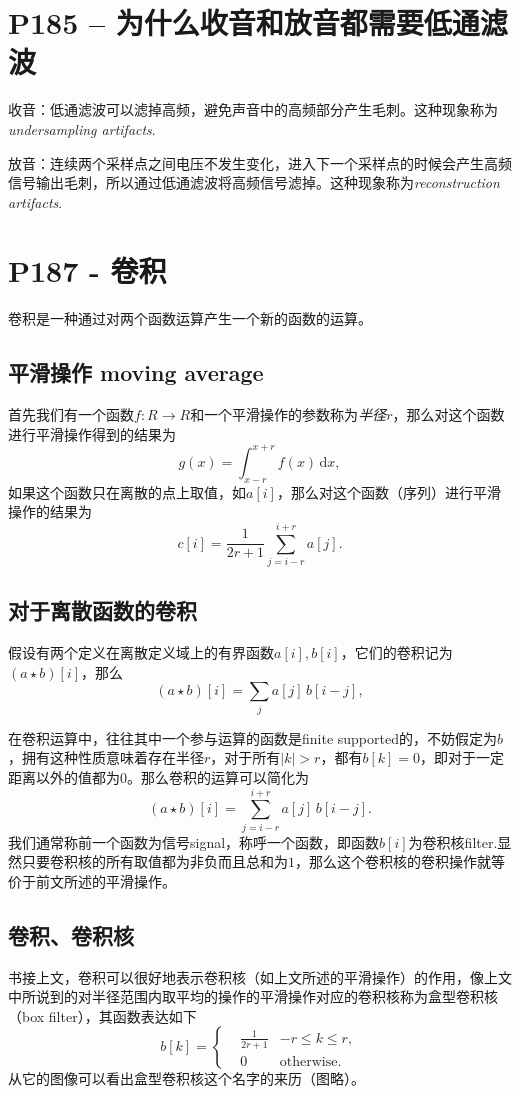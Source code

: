 \documentclass{ctexart}
\begin{document}
	\section{P185 – 为什么收音和放音都需要低通滤波}
	收音：低通滤波可以滤掉高频，避免声音中的高频部分产生毛刺。这种现象称为\emph{undersampling artifacts}.
	
	放音：连续两个采样点之间电压不发生变化，进入下一个采样点的时候会产生高频信号输出毛刺，所以通过低通滤波将高频信号滤掉。这种现象称为\emph{reconstruction artifacts}.


	\section{P187 - 卷积}
	卷积是一种通过对两个函数运算产生一个新的函数的运算。

	\subsection{平滑操作 moving average}
	首先我们有一个函数$f:R\to R$和一个平滑操作的参数称为\emph{半径$r$}，那么对这个函数进行平滑操作得到的结果为
	$$
	g(x)=\int_{x-r}^{x+r}{f(x)\,\mathrm dx},
	$$
	如果这个函数只在离散的点上取值，如$a[i]$，那么对这个函数（序列）进行平滑操作的结果为
	$$
	c[i]=\frac1{2r+1}\sum_{j=i-r}^{i+r}a[j].
	$$

	\subsection{对于离散函数的卷积}
	假设有两个定义在离散定义域上的有界函数$a[i],b[i]$，它们的卷积记为$(a\star b)[i]$，那么
	$$
	(a\star b)[i]=\sum_j{a[j]\, b[i-j]},
	$$

	在卷积运算中，往往其中一个参与运算的函数是finite supported的，不妨假定为$b$，拥有这种性质意味着存在半径$r$，对于所有$|k|>r$，都有$b[k]=0$，即对于一定距离以外的值都为$0$。那么卷积的运算可以简化为
	$$
	(a\star b)[i]=\sum_{j=i-r}^{i+r}{a[j]\, b[i-j]}.
	$$
	我们通常称前一个函数为信号signal，称呼一个函数，即函数$b[i]$为卷积核filter.显然只要卷积核的所有取值都为非负而且总和为$1$，那么这个卷积核的卷积操作就等价于前文所述的平滑操作。

	\subsection{卷积、卷积核}
	书接上文，卷积可以很好地表示卷积核（如上文所述的平滑操作）的作用，像上文中所说到的对半径范围内取平均的操作的平滑操作对应的卷积核称为盒型卷积核（box filter），其函数表达如下
	$$
	b[k]=\left\{
		\begin{aligned}
			&\frac1{2r+1}&-r\leqslant k\leqslant r,\\
			&0&\text{otherwise}.
		\end{aligned}
	\right.
	$$
	从它的图像可以看出盒型卷积核这个名字的来历（图略）。
\end{document}
